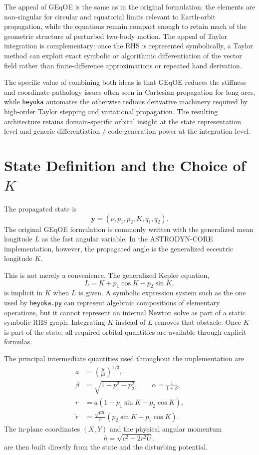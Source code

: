 \documentclass[11pt]{article}
\begin{document}
The appeal of GEqOE is the same as in the original formulation: the elements are
non-singular for circular and equatorial limits relevant to Earth-orbit
propagation, while the equations remain compact enough to retain much of the
geometric structure of perturbed two-body motion. The appeal of Taylor
integration is complementary: once the RHS is represented symbolically, a Taylor
method can exploit exact symbolic or algorithmic differentiation of the vector
field rather than finite-difference approximations or repeated hand derivation.

The specific value of combining both ideas is that GEqOE reduces the stiffness
and coordinate-pathology issues often seen in Cartesian propagation for long
arcs, while \texttt{heyoka} automates the otherwise tedious derivative
machinery required by high-order Taylor stepping and variational propagation.
The resulting architecture retains domain-specific orbital insight at the state
representation level and generic differentiation / code-generation power at the
integration level.

\section{State Definition and the Choice of \texorpdfstring{$K$}{K}}

The propagated state is
\begin{equation}
\bm{y} = (\nu, p_1, p_2, K, q_1, q_2).
\end{equation}
The original GEqOE formulation is commonly written with the generalized mean
longitude $L$ as the fast angular variable. In the ASTRODYN-CORE
implementation, however, the propagated angle is the generalized eccentric
longitude $K$.

This is not merely a convenience. The generalized Kepler equation,
\begin{equation}
L = K + p_1 \cos K - p_2 \sin K,
\end{equation}
is implicit in $K$ when $L$ is given. A symbolic expression system such as the
one used by \texttt{heyoka.py} can represent algebraic compositions of
elementary operations, but it cannot represent an internal Newton solve as part
of a static symbolic RHS graph. Integrating $K$ instead of $L$ removes that
obstacle. Once $K$ is part of the state, all required orbital quantities are
available through explicit formulas.

The principal intermediate quantities used throughout the implementation are
\begin{align}
a &= \left( \frac{\mu}{\nu^2} \right)^{1/3}, \\
\beta &= \sqrt{1-p_1^2-p_2^2}, \qquad
\alpha = \frac{1}{1+\beta}, \\
r &= a(1-p_1\sin K-p_2\cos K), \\
\dot{r} &= \frac{\sqrt{\mu a}}{r}(p_2\sin K-p_1\cos K).
\end{align}
The in-plane coordinates $(X,Y)$ and the physical angular momentum
\begin{equation}
h = \sqrt{c^2 - 2 r^2 U},
\end{equation}
are then built directly from the state and the disturbing potential.
\end{document}
